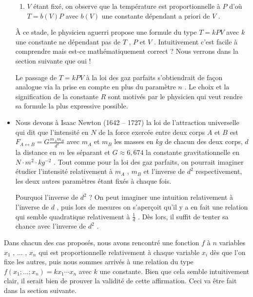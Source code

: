 \begin{itemize}[label=\small\textbullet]
\begin{enumerate}[label=(\alph*)]
		\item $V$ étant fixé, on observe que la température est proportionnelle à $P$ d'où $T = b(V) P$ avec $b(V)$ une constante dépendant a priori de $V$ .
	\end{enumerate}

	\noindent
	À ce stade, le physicien aguerri propose une formule du type $T = k P V$ avec $k$ une constante ne dépendant pas de $T$ , $P$ et $V$ .
	Intuitivement c'est facile à comprendre mais est-ce mathématiquement correct ? Nous verrons dans la section suivante que oui !
	
	\smallskip
	\noindent
	Le passage de $T = k P V$ à la loi des gaz parfaits s'obtiendrait de façon analogue via la prise en compte en plus du paramètre $n$ .
	Le choix et la signification de la constante $R$ sont motivés par le physicien qui veut rendre sa formule la plus expressive possible.




	\medskip
	\item Nous devons à Isaac Newton (1642 -- 1727) la loi de l'attraction universelle qui dit que l'intensité en $N$ de la force exercée entre deux corps $A$ et $B$ est $F_{A \leftrightarrow B} = G \frac{m_A m_B}{d^2}$ avec $m_A$ et $m_B$ les masses en $kg$ de chacun des deux corps, $d$ la distance en $m$ les séparant et $G \approx 6,674$ la constante gravitationnelle en $N \cdot m^2 \cdot kg^{-2}$ .
	Tout comme pour la loi des gaz parfaits, on pourrait imaginer étudier l'intensité relativement à $m_A$ , $m_B$ et l'inverse de $d^2$ respectivement, les deux autres paramètres étant fixés à chaque fois.
	
	\smallskip
	\noindent
	Pourquoi l'inverse de $d^2$ ? On peut imaginer une intuition relativement à l'inverse de $d$ , puis lors de mesures on s'aperçoit qu'il y a en fait une relation qui semble quadratique relativement à $\frac{1}{d}$ . Dès lors, il suffit de tenter sa chance avec l'inverse de $d^2$ .
\end{itemize}




\medskip

Dans chacun des cas proposés, nous avons rencontré une fonction $f$ à $n$ variables $x_1$ , ... , $x_n$ qui est proportionnelle relativement à chaque variable $x_i$ dès que l'on fixe les autres,
puis nous sommes arrivés à une relation du type $f(x_1 ; ... ; x_n) = k x_1 \cdots x_n$ avec $k$ une constante. Bien que cela semble intuitivement clair, il serait bien de prouver la validité de cette affirmation. Ceci va être fait dans la section suivante.


